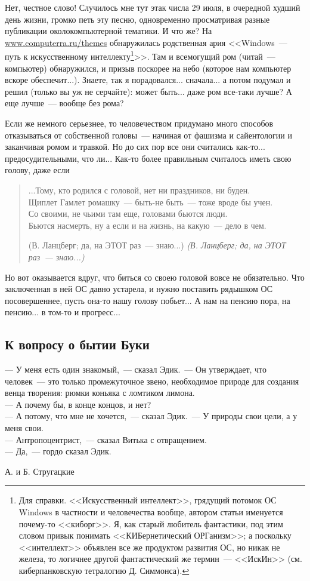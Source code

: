 \documentclass{scrbook}
\makeatletter
\newcommand{\defaultepigraphwidth}{0.5} %
\newcommand{\flqq}{<<}
\newcommand{\frqq}{>>}
\newcommand{\mdash}{~--- }
\newcommand{\sdash}{--- } %
\newcommand{\commamdash}{~--- } %
\newcommand{\essaysection}[1]{\subsection*{#1}\nopagebreak}
\newcommand{\myepigraph}[3][\@empty]{
	\ifx\@empty#1
		\setlength{\epigraphwidth}{\defaultepigraphwidth\textwidth}
	\else
		\setlength{\epigraphwidth}{#1\textwidth}
	\fi
	\epigraph{#2}{#3}
	\setlength{\epigraphwidth}{\defaultepigraphwidth\textwidth} %
	\nopagebreak
}
\newcommand{\inlineauthor}[1]{\emph{#1}}
\newcommand{\myverse}[2][\empty]{
	\begin{verse}
	#2

	\ifx\@empty#1
	\else
		\nopagebreak
		\inlineauthor{#1}
	\fi
	\end{verse}
}
\makeatother
\begin{document}
Нет, честное слово! Случилось мне тут этак числа 29 июля, в очередной худший день жизни, громко петь эту песню, одновременно просматривая разные публикации околокомпьютерной тематики. И что же? На \url{www.computerra.ru/themes} обнаружилась родственная ария {\flqq}Windows{\mdash}путь к искусственному интеллекту\footnote{Для справки. {\flqq}Искусственный интеллект{\frqq}, грядущий потомок ОС Windows в частности и человечества вообще, автором статьи именуется почему-то {\flqq}киборг{\frqq}. Я, как старый любитель фантастики, под этим словом привык понимать {\flqq}КИБернетический ОРГанизм{\frqq}; а поскольку {\flqq}интеллект{\frqq} объявлен все же продуктом развития ОС, но никак не железа, то логичнее другой фантастический же термин{\mdash}{\flqq}ИскИн{\frqq} (см. киберпанковскую тетралогию Д. Симмонса).}{\frqq}. Там и всемогущий ром (читай{\mdash}компьютер) обнаружился, и призыв поскорее на небо (которое нам компьютер вскоре обеспечит...). Знаете, так я порадовался... сначала... а потом подумал и решил (только вы уж не серчайте): может быть... даже ром все-таки лучше? А еще лучше{\mdash}вообще без рома?

Если же немного серьезнее, то человечеством придумано много способов отказываться от собственной головы{\mdash}начиная от фашизма и сайентологии и заканчивая ромом и травкой. Но до сих пор все они считались как-то... предосудительными, что ли... Как-то более правильным считалось иметь свою голову, даже если

\myverse[(В. Ланцберг; да, на ЭТОТ раз{\mdash}знаю...)]{
...Тому, кто родился с головой, нет ни праздников, ни буден. \\
Щиплет Гамлет ромашку{\mdash}быть-не быть{\mdash}тоже вроде бы учен. \\
Со своими, не чьими там еще, головами бьются люди. \\
Бьются насмерть, ну а если и на жизнь, на какую{\mdash}дело в чем.
}

Но вот оказывается вдруг, что биться со своею головой вовсе не обязательно. Что заключенная в ней ОС давно устарела, и нужно поставить рядышком ОС посовершеннее, пусть она-то нашу голову побьет... А нам на пенсию пора, на пенсию... в том-то и прогресс...

\essaysection{К вопросу о бытии Буки}

\myepigraph{{\sdash} У меня есть один знакомый,{\commamdash}сказал Эдик.{\mdash}Он утверждает, что человек{\mdash}это только промежуточное звено, необходимое природе для создания венца творения: рюмки коньяка с ломтиком лимона. \\
{\sdash} А почему бы, в конце концов, и нет? \\
{\sdash} А потому, что мне не хочется,{\commamdash}сказал Эдик.{\mdash}У природы свои цели, а у меня свои. \\
{\sdash} Антропоцентрист,{\commamdash}сказал Витька с отвращением. \\
{\sdash} Да,{\commamdash}гордо сказал Эдик.}
{А. и Б. Стругацкие}
\end{document}

